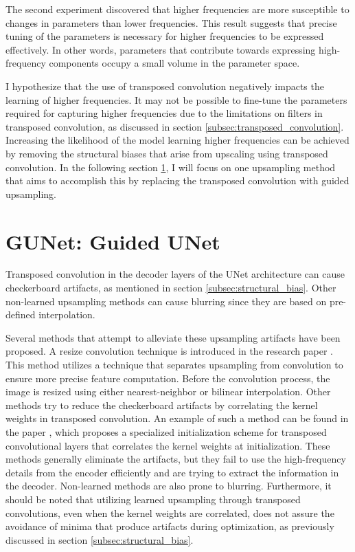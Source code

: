 The second experiment discovered that higher frequencies are more susceptible to changes in parameters than lower frequencies. This result suggests that precise tuning of the parameters is necessary for higher frequencies to be expressed effectively. In other words, parameters that contribute towards expressing high-frequency components occupy a small volume in the parameter space. \cite{spectralbias}

I hypothesize that the use of transposed convolution negatively impacts the learning of higher frequencies. It may not be possible to fine-tune the parameters required for capturing higher frequencies due to the limitations on filters in transposed convolution, as discussed in section \ref{subsec:transposed_convolution}. Increasing the likelihood of the model learning higher frequencies can be achieved by removing the structural biases that arise from upscaling using transposed convolution. In the following section \ref{sec:guided_upsampling}, I will focus on one upsampling method that aims to accomplish this by replacing the transposed convolution with guided upsampling.

\section{GUNet: Guided UNet}
\label{sec:guided_upsampling}

Transposed convolution in the decoder layers of the UNet architecture can cause checkerboard artifacts, as mentioned in section \ref{subsec:structural_bias}. Other non-learned upsampling methods can cause blurring since they are based on pre-defined interpolation.

Several methods that attempt to alleviate these upsampling artifacts have been proposed. A resize convolution technique is introduced in the research paper \cite{deconvolutionbias}. This method utilizes a technique that separates upsampling from convolution to ensure more precise feature computation. Before the convolution process, the image is resized using either nearest-neighbor or bilinear interpolation. Other methods try to reduce the checkerboard artifacts by correlating the kernel weights in transposed convolution. An example of such a method can be found in the paper \cite{aitken2017checkerboard}, which proposes a specialized initialization scheme for transposed convolutional layers that correlates the kernel weights at initialization. These methods generally eliminate the artifacts, but they fail to use the high-frequency details from the encoder efficiently and are trying to extract the information in the decoder. Non-learned methods are also prone to blurring. Furthermore, it should be noted that utilizing learned upsampling through transposed convolutions, even when the kernel weights are correlated, does not assure the avoidance of minima that produce artifacts during optimization, as previously discussed in section \ref{subsec:structural_bias}. \cite{gunet}

